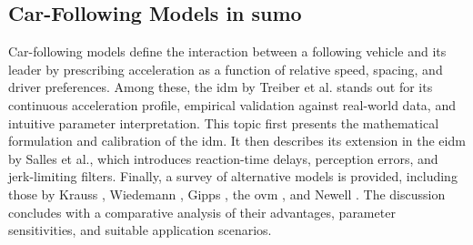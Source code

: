 
\subsection{Car-Following Models in \ac{sumo}}
\label{subsec:car_following_models}

Car-following models define the interaction between a following vehicle and its leader by prescribing acceleration as a function of relative speed, spacing, and driver preferences. Among these, the \ac{idm} by Treiber et al. \cite{Treiber_2000} stands out for its continuous acceleration profile, empirical validation against real-world data, and intuitive parameter interpretation. This topic first presents the mathematical formulation and calibration of the \ac{idm}. It then describes its extension in the \ac{eidm} by Salles et al., which introduces reaction-time delays, perception errors, and jerk-limiting filters. \cite{Salles2022} Finally, a survey of alternative models is provided, including those by Krauss \cite{Krauss1997}, Wiedemann \cite{Wiedemann1974}, Gipps \cite{Gipps1981}, the \ac{ovm} \cite{Bando1995}, and Newell \cite{Newell1961}. The discussion concludes with a comparative analysis of their advantages, parameter sensitivities, and suitable application scenarios.

